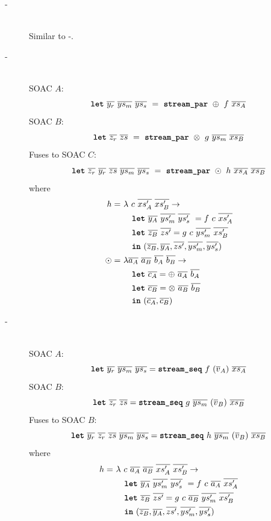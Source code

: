 \begin{description}
\item[-]\hfill\\

  Similar to -.

\item[-]\hfill\\

  SOAC $A$:
  \[
    \mbox{\texttt{\bfseries{let}}}~\overline{y_{r}}~\overline{ys_{m}}~\overline{ys_{s}}~=~\mbox{\texttt{\bfseries{stream\_par}}}~\oplus~f~\overline{xs_{A}}
  \]
  SOAC $B$:
  \[
    \mbox{\texttt{\bfseries{let}}}~\overline{z_{r}}~\overline{zs}~=~\mbox{\texttt{\bfseries{stream\_par}}}~\otimes~g~\overline{ys_{m}}~\overline{xs_{B}}
  \]
  Fuses to SOAC $C$:
  \[
    \mbox{\texttt{\bfseries{let}}}~\overline{z_{r}}~\overline{y_{r}}~\overline{zs}~\overline{ys_{m}}~\overline{ys_{s}}~=~\mbox{\texttt{\bfseries{stream\_par}}}~\odot~h~\overline{xs_{A}}~\overline{xs_{B}}
  \]
where
  \begin{align*}
    h =~& \lambda~c~\overline{xs'_{A}}~\overline{xs'_{B}} \rightarrow \\
        & \quad \mbox{\texttt{\bfseries{let}}}~\overline{y_{A}}~\overline{ys'_{m}}~\overline{ys'_{s}}~ = f~c~\overline{xs'_{A}} \\
        & \quad \mbox{\texttt{\bfseries{let}}}~\overline{z_{B}}~\overline{zs'} = g~c~\overline{ys'_{m}}~\overline{xs'_{B}} \\
        & \quad \mbox{\texttt{\bfseries{in}}}~(\overline{z_{B}},\overline{y_{A}},\overline{zs'},\overline{ys'_{m}},\overline{ys'_{s}}) \\
    \odot =~& \lambda \overline{a_{A}}~\overline{a_{B}}~\overline{b_{A}}~\overline{b_{B}} \rightarrow \\
        & \quad \mbox{\texttt{\bfseries{let}}}~\overline{c_{A}} = \oplus~\overline{a_{A}}~\overline{b_{A}} \\
        & \quad \mbox{\texttt{\bfseries{let}}}~\overline{c_{B}} = \otimes~\overline{a_{B}}~\overline{b_{B}} \\
        & \quad \mbox{\texttt{\bfseries{in}}}~(\overline{c_{A}}, \overline{c_{B}})
  \end{align*}

\item[-]\hfill\\

  SOAC $A$:
  \[
    \mbox{\texttt{\bfseries{let}}}~\overline{y_{r}}~\overline{ys_{m}}~\overline{ys_{s}} = \mbox{\texttt{\bfseries{stream\_seq}}}~f~(\overline{v}_{A})~\overline{xs_{A}}
  \]
  SOAC $B$:
  \[
    \mbox{\texttt{\bfseries{let}}}~\overline{z_{r}}~\overline{zs} = \mbox{\texttt{\bfseries{stream\_seq}}}~g~\overline{ys_{m}}~(\overline{v}_{B})~\overline{xs_{B}}
  \]
  Fuses to SOAC $B$:
  \[
    \mbox{\texttt{\bfseries{let}}}~\overline{y_{r}}~\overline{z_{r}}~\overline{zs}~\overline{ys_{m}}~\overline{ys_{s}} = \mbox{\texttt{\bfseries{stream\_seq}}}~h~\overline{ys_{m}}~(\overline{v}_{B})~\overline{xs_{B}}
  \]
where
  \begin{align*}
    h =~& \lambda~c~\overline{a_{A}}~\overline{a_{B}}~\overline{xs'_{A}}~\overline{xs'_{B}} \rightarrow \\
        & \quad \mbox{\texttt{\bfseries{let}}}~\overline{y_{A}}~\overline{ys'_{m}}~\overline{ys'_{s}}~ = f~c~\overline{a_{A}}~\overline{xs'_{A}} \\
        & \quad \mbox{\texttt{\bfseries{let}}}~\overline{z_{B}}~\overline{zs'} = g~c~\overline{a_{B}}~\overline{ys'_{m}}~\overline{xs'_{B}} \\
        & \quad \mbox{\texttt{\bfseries{in}}}~(\overline{z_{B}},\overline{y_{A}},\overline{zs'},\overline{ys'_{m}},\overline{ys'_{s}}) \\
  \end{align*}

\end{description}

